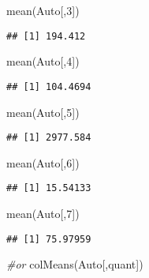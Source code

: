 \documentclass[
]{article}
\newenvironment{Shaded}{\begin{snugshade}}{\end{snugshade}}
\newcommand{\CommentTok}[1]{\textcolor[rgb]{0.56,0.35,0.01}{\textit{#1}}}
\newcommand{\DecValTok}[1]{\textcolor[rgb]{0.00,0.00,0.81}{#1}}
\newcommand{\FunctionTok}[1]{\textcolor[rgb]{0.00,0.00,0.00}{#1}}
\newcommand{\NormalTok}[1]{#1}
\begin{document}
\begin{Shaded}
\begin{Highlighting}[]
\FunctionTok{mean}\NormalTok{(Auto[,}\DecValTok{3}\NormalTok{])}
\end{Highlighting}
\end{Shaded}

\begin{verbatim}
## [1] 194.412
\end{verbatim}

\begin{Shaded}
\begin{Highlighting}[]
\FunctionTok{mean}\NormalTok{(Auto[,}\DecValTok{4}\NormalTok{])}
\end{Highlighting}
\end{Shaded}

\begin{verbatim}
## [1] 104.4694
\end{verbatim}

\begin{Shaded}
\begin{Highlighting}[]
\FunctionTok{mean}\NormalTok{(Auto[,}\DecValTok{5}\NormalTok{])}
\end{Highlighting}
\end{Shaded}

\begin{verbatim}
## [1] 2977.584
\end{verbatim}

\begin{Shaded}
\begin{Highlighting}[]
\FunctionTok{mean}\NormalTok{(Auto[,}\DecValTok{6}\NormalTok{])}
\end{Highlighting}
\end{Shaded}

\begin{verbatim}
## [1] 15.54133
\end{verbatim}

\begin{Shaded}
\begin{Highlighting}[]
\FunctionTok{mean}\NormalTok{(Auto[,}\DecValTok{7}\NormalTok{])}
\end{Highlighting}
\end{Shaded}

\begin{verbatim}
## [1] 75.97959
\end{verbatim}

\begin{Shaded}
\begin{Highlighting}[]
\CommentTok{\#or}
\FunctionTok{colMeans}\NormalTok{(Auto[,quant])}
\end{Highlighting}
\end{Shaded}
\end{document}
